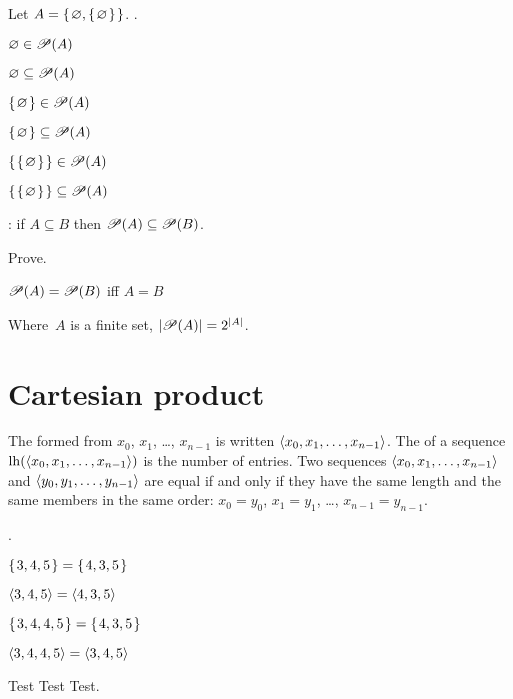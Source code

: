 \documentclass{ibl}
\begin{document}
\begin{ex}  Let $A=\mbox{$\{\hspace{0.1em}\varnothing,\mbox{$\{\hspace{0.1em}\varnothing\hspace{0.1em}\}$}\hspace{0.1em}\}$}$. \pord.
\begin{exes}
\item $\varnothing\in\mathscr{P}(A)$    
\item $\varnothing\subseteq\mathscr{P}(A)$    
\item $\mbox{$\{\hspace{0.1em}\varnothing\hspace{0.1em}\}$}\in\mathscr{P}(A)$    
\item $\mbox{$\{\hspace{0.1em}\varnothing\hspace{0.1em}\}$}\subseteq\mathscr{P}(A)$    
\item $\mbox{$\{\hspace{0.1em}\mbox{$\{\hspace{0.1em}\varnothing\hspace{0.1em}\}$}\hspace{0.1em}\}$}\in\mathscr{P}(A)$    
\item $\mbox{$\{\hspace{0.1em}\mbox{$\{\hspace{0.1em}\varnothing\hspace{0.1em}\}$}\hspace{0.1em}\}$}\subseteq\mathscr{P}(A)$    
\end{exes}
\end{ex}

\begin{ex} \pord:
if $A\subseteq B$ then $\mathscr{P}(A)\subseteq\mathscr{P}(B)$.  
\end{ex}

\begin{ex} Prove.
\begin{exes}
\item $\mathscr{P}(A)=\mathscr{P}(B)$ iff $A= B$  
\item Where~$A$ is a finite set, $|\mathscr{P}(A)|=2^{|A|}$.    
\end{exes}
\end{ex}





\section{Cartesian product}

\begin{df}
The  
formed from $x_0$, $x_1$, \ldots, $x_{n-1}$ is written
$\langle x_0, x_1, \ldots, x_{n-1}\rangle$.
The  of a sequence $\operatorname*{lh}(\langle x_0, x_1, \ldots, x_{n-1}\rangle)$
is the number of entries.
Two sequences $\langle x_0, x_1, \ldots, x_{n-1}\rangle$ and
$\langle y_0, y_1, \ldots, y_{n-1}\rangle$ are equal if and only if
they have the same length and
the same members in the same order:
$x_0=y_0$, $x_1=y_1$, \ldots, $x_{n-1}=y_{n-1}$. 
\end{df}

\begin{ex}\pord.
\begin{exes}
\item $\mbox{$\{\hspace{0.1em}3, 4, 5\hspace{0.1em}\}$}=\mbox{$\{\hspace{0.1em}4, 3, 5\hspace{0.1em}\}$}$
\item $\langle3, 4, 5\rangle=\langle4, 3, 5\rangle$
\item $\mbox{$\{\hspace{0.1em}3, 4, 4, 5\hspace{0.1em}\}$}=\mbox{$\{\hspace{0.1em}4, 3, 5\hspace{0.1em}\}$}$
\item $\langle3, 4,4,5\rangle=\langle3,4,5\rangle$  
\end{exes}
\begin{ans}
 Test Test Test.
\end{ans}
\end{ex}
\end{document}
